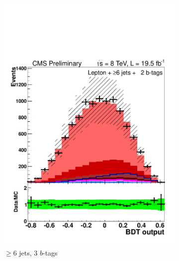 \begin{figure}[hbtp]
\begin{subfigure}[hbtp]{0.31\textwidth}
     \includegraphics[width=\textwidth]{Figures/Analysis_2_Diagrams/LJ_plots_lep/6j2t/lep_disc_final10v16_8TeV_CFMlpANN_BDT_6j2t_cumulative_wRatio_noLegend_lin.pdf}
     \caption{$\ge$6 jets, 3 $b$-tags}\label{lj_BDToutput_8TeV_5}
   \end{subfigure}
   ~ %
   \begin{subfigure}[hbtp]{0.31\textwidth} 

\end{subfigure}
\end{figure}
